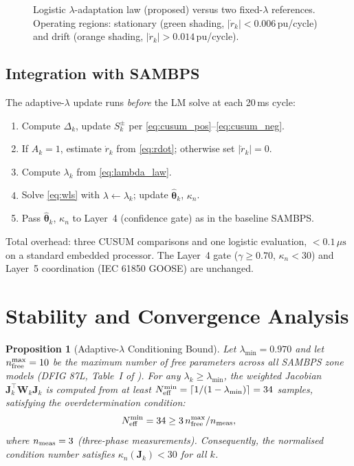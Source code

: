 \documentclass[journal]{IEEEtran}
\newtheorem{proposition}{Proposition}
\newcommand{\lambdamin}{\lambda_{\min}}
\newcommand{\Neff}{N_{\rm eff}}
\newcommand{\kappan}{\kappa_n}
\newcommand{\rdot}{\dot{r}_k}
\begin{document}
\begin{figure}[htbp]
  \centering
  
  \caption{Logistic $\lambda$-adaptation law (proposed) versus two
           fixed-$\lambda$ references.  Operating regions: stationary
           (green shading, $|\dot{r}_k| < 0.006$\,pu/cycle) and drift
           (orange shading, $|\dot{r}_k| > 0.014$\,pu/cycle).}
  \label{fig:lambda_curve}
\end{figure}

\subsection{Integration with SAMBPS}

The adaptive-$\lambda$ update runs \emph{before} the LM solve at
each 20\,ms cycle:
\begin{enumerate}
  \item Compute $\Delta_k$, update $S_k^{\pm}$ per \eqref{eq:cusum_pos}--\eqref{eq:cusum_neg}.
  \item If $A_k = 1$, estimate $\rdot$ from \eqref{eq:rdot};
        otherwise set $|\rdot| = 0$.
  \item Compute $\lambda_k$ from \eqref{eq:lambda_law}.
  \item Solve \eqref{eq:wls} with $\lambda \leftarrow \lambda_k$;
        update $\hat{\bm{\theta}}_k$, $\kappan$.
  \item Pass $\hat{\bm{\theta}}_k$, $\kappan$ to Layer~4
        (confidence gate) as in the baseline SAMBPS.
\end{enumerate}
Total overhead: three CUSUM comparisons and one logistic evaluation,
$< 0.1\,\mu\text{s}$ on a standard embedded processor.
The Layer~4 gate ($\gamma \geq 0.70$, $\kappan < 30$) and Layer~5
coordination (IEC 61850 GOOSE) are unchanged.

\section{Stability and Convergence Analysis}
\label{sec:stability}

\begin{proposition}[Adaptive-$\lambda$ Conditioning Bound]
\label{prop:conditioning}
Let $\lambdamin = 0.970$ and let $n_{\rm free}^{\max} = 10$ be the
maximum number of free parameters across all SAMBPS zone models
(DFIG 87L, Table~I of \cite{SAMBP_TR65}).  For any
$\lambda_k \geq \lambdamin$, the weighted Jacobian
$\mathbf{J}_k^\top \mathbf{W}_k \mathbf{J}_k$ is computed from at
least $\Neff^{\min} = \lceil 1/(1-\lambdamin)\rceil = 34$ samples,
satisfying the overdetermination condition:
\begin{equation}
  \Neff^{\min} = 34 \geq 3\,n_{\rm free}^{\max} / n_{\rm meas},
  \label{eq:overdetermined}
\end{equation}
where $n_{\rm meas} = 3$ (three-phase measurements).  Consequently,
the normalised condition number satisfies $\kappan(\mathbf{J}_k) < 30$
for all $k$.
\end{proposition}
\end{document}
